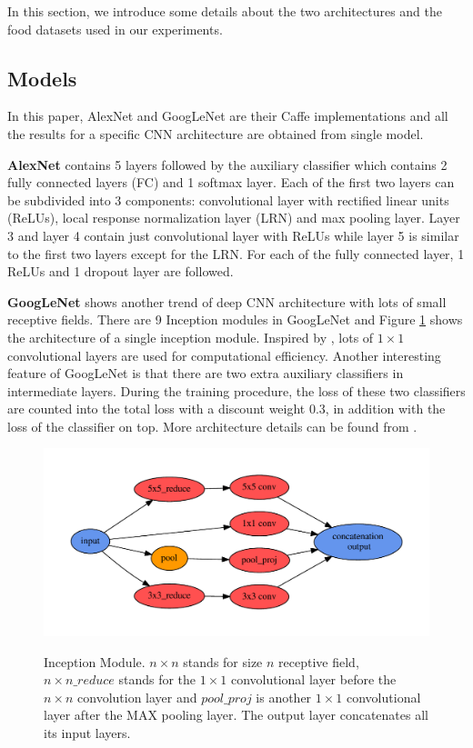 ﻿In this section, we introduce some details about the two architectures and the food datasets used in our experiments.
\subsection{Models}
In this paper, AlexNet and GoogLeNet are their Caffe \cite{jia2014caffe} implementations and all the results for a specific CNN architecture are obtained from single model.

\textbf{AlexNet}
 contains 5 layers followed by the auxiliary classifier which contains 2 fully connected layers (FC) and 1 softmax layer. Each of the first two layers can be subdivided into 3 components: convolutional layer with rectified linear units (ReLUs), local response normalization layer (LRN) and max pooling layer. Layer 3 and layer 4 contain just convolutional layer with ReLUs while layer 5 is similar to the first two layers except for the LRN. For each of the fully connected layer, 1 ReLUs and 1 dropout \cite{srivastava2014dropout} layer are followed.

 \textbf{GoogLeNet}
  shows another trend of deep CNN architecture with lots of small receptive fields. There are 9 Inception modules in GoogLeNet and Figure \ref{incept} shows the architecture of a single inception module. Inspired by \cite{linNiN}, lots of $1\times 1$ convolutional layers are used for computational efficiency. Another interesting feature of GoogLeNet is that there are two extra auxiliary classifiers in intermediate layers. During the training procedure, the loss of these two classifiers are counted into the total loss with a discount weight 0.3, in addition with the loss of the classifier on top. More architecture details can be found from \cite{szegedy2014going}.

\begin{figure}
  \centering
  \includegraphics[scale=.45]{fig/inception.pdf}\\
  \caption{Inception Module. $n\times n$ stands for size $n$ receptive field, $n\times n\_reduce$ stands for the $1\times 1$ convolutional layer before the $n\times n$ convolution layer and $pool\_proj$ is another $1\times 1$ convolutional layer after the MAX pooling layer. The output layer concatenates all its input layers.}\label{incept}
\end{figure}

